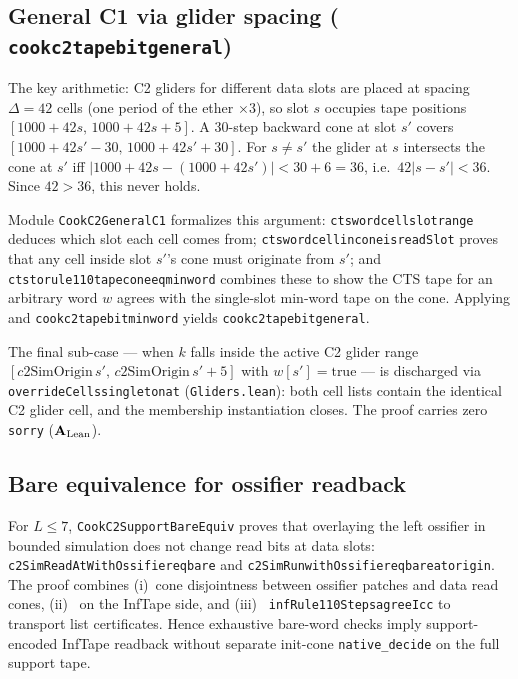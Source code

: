 \documentclass[11pt]{article}
\theoremstyle{remark}
\newcommand{\CatAL}{\ensuremath{\textbf{A}_{\rm Lean}}}
\newcommand{\lean}[1]{%
  \penalty-100
  \begingroup\def\_{\textunderscore\allowbreak}\texttt{#1}\endgroup}
\begin{document}
\begin{appendices}
\subsection{General C1 via glider spacing (\lean{cook\_c2\_tape\_bit\_general})}
\label{app:general-c1}

The key arithmetic: C2 gliders for different data slots are placed at spacing
$\Delta = 42$ cells (one period of the ether $\times 3$), so slot $s$ occupies
tape positions $[1000 + 42s,\, 1000 + 42s + 5]$.
A $30$-step backward cone at slot $s'$ covers $[1000 + 42s' - 30,\, 1000 + 42s' + 30]$.
For $s \ne s'$ the glider at $s$ intersects the cone at $s'$ iff
$|1000 + 42s - (1000 + 42s')| < 30 + 6 = 36$, i.e.\ $42|s - s'| < 36$.
Since $42 > 36$, this never holds.

Module \texttt{CookC2GeneralC1} formalizes this argument:
\lean{cts\_word\_cell\_slot\_range} deduces which slot each cell comes from;
\lean{cts\_word\_cell\_in\_cone\_is\_readSlot} proves that any cell inside slot $s'$'s
cone must originate from $s'$; and
\lean{cts\_to\_rule110\_tape\_cone\_eq\_min\_word} combines these to show the CTS tape
for an arbitrary word $w$ agrees with the single-slot min-word tape on the cone.
Applying  and \lean{cook\_c2\_tape\_bit\_min\_word} yields
\lean{cook\_c2\_tape\_bit\_general}.

The final sub-case --- when $k$ falls inside the active C2 glider range
$[c2\text{SimOrigin}\,s',\, c2\text{SimOrigin}\,s' + 5]$ with $w[s'] = \text{true}$ ---
is discharged via \lean{overrideCells\_singleton\_at} (\texttt{Gliders.lean}):
both cell lists contain the identical C2 glider cell, and the membership instantiation closes.
The proof carries zero \texttt{sorry} ($\CatAL$).

\subsection{Bare equivalence for ossifier readback}
\label{app:bare}

For $L \le 7$, \texttt{CookC2SupportBareEquiv} proves that overlaying the left ossifier in
bounded simulation does not change read bits at data slots:
\lean{c2SimReadAtWithOssifier\_eq\_bare} and
\lean{c2SimRun\_withOssifier\_eq\_bare\_at\_origin}.
The proof combines (i)~cone disjointness between ossifier patches and data read cones,
(ii)~ on the InfTape side, and
(iii)~\lean{infRule110Steps\_agree\_Icc} to transport list certificates.
Hence exhaustive bare-word checks imply support-encoded InfTape readback without
separate init-cone \texttt{native\_decide} on the full support tape.


\end{appendices}
\end{document}
